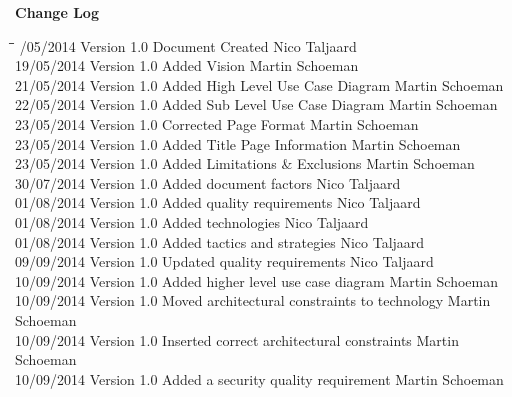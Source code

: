 \documentclass[letterpaper]{article}
\begin{document}

	\newpage
		{\LARGE \bf Change Log}\\[2em]
		
		\begin{tabbing}
			\hspace*{2.5cm}\=\hspace*{2.5cm}\=\hspace*{8cm}\=\hspace*{3cm} /05/2014	\> Version 1.0	\> Document Created 							\> Nico Taljaard \\
			19/05/2014  \> Version 1.0  \> Added Vision									\> Martin Schoeman \\
			21/05/2014  \> Version 1.0  \> Added High Level Use Case Diagram			\> Martin Schoeman\\
			22/05/2014  \> Version 1.0  \> Added Sub Level Use Case Diagram				\> Martin Schoeman\\
			23/05/2014  \> Version 1.0  \> Corrected Page Format						\> Martin Schoeman \\
			23/05/2014  \> Version 1.0  \> Added Title Page Information					\> Martin Schoeman \\
			23/05/2014  \> Version 1.0  \> Added Limitations \& Exclusions				\> Martin Schoeman \\
			30/07/2014	\> Version 1.0	\> Added document factors						\> Nico Taljaard \\
			01/08/2014	\> Version 1.0	\> Added quality requirements					\> Nico Taljaard \\
			01/08/2014	\> Version 1.0	\> Added technologies							\> Nico Taljaard \\
			01/08/2014	\> Version 1.0	\> Added tactics and strategies					\> Nico Taljaard \\
			09/09/2014	\> Version 1.0	\> Updated quality requirements					\> Nico Taljaard \\
			10/09/2014 	\> Version 1.0  \> Added higher level use case diagram			\> Martin Schoeman\\
			10/09/2014  \> Version 1.0	\> Moved architectural constraints to technology\> Martin Schoeman\\
			10/09/2014  \> Version 1.0  \> Inserted correct architectural constraints	\> Martin Schoeman\\
			10/09/2014	\> Version 1.0  \> Added a security quality requirement			\> Martin Schoeman\\

\end{tabbing}
\end{document}
